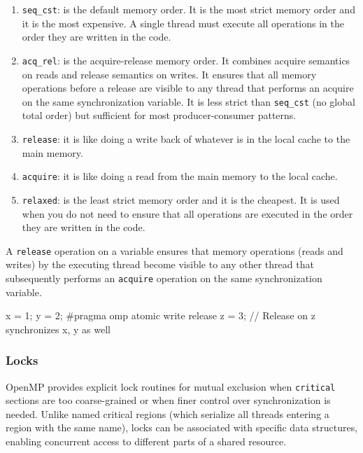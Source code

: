 \begin{enumerate}[leftmargin=*]
\item \texttt{seq\_cst}: is the default memory order. It is the most strict memory order and it is the most expensive. A single thread must execute all operations in the order they are written in the code.

\item \texttt{acq\_rel}: is the acquire-release memory order. It combines acquire semantics on reads and release semantics on writes. It ensures that all memory operations before a release are visible to any thread that performs an acquire on the same synchronization variable. It is less strict than \texttt{seq\_cst} (no global total order) but sufficient for most producer-consumer patterns.

\item \texttt{release}: it is like doing a write back of whatever is in the local cache to the main memory.

\item \texttt{acquire}: it is like doing a read from the main memory to the local cache.

\item \texttt{relaxed}: is the least strict memory order and it is the cheapest. It is used when you do not need to ensure that all operations are executed in the order they are written in the code.
\end{enumerate}

A \texttt{release} operation on a variable ensures that  memory operations (reads and writes) by the executing thread become visible to any other thread that subsequently performs an \texttt{acquire} operation on the same synchronization variable.

\begin{codeblock}[language = C]
x = 1;
y = 2;
#pragma omp atomic write release
z = 3; // Release on z synchronizes x, y as well
\end{codeblock}

\subsubsection{Locks}

OpenMP provides explicit lock routines for mutual exclusion when \texttt{critical} sections are too coarse-grained or when finer control over synchronization is needed. Unlike named critical regions (which serialize all threads entering a region with the same name), locks can be associated with specific data structures, enabling concurrent access to different parts of a shared resource.

